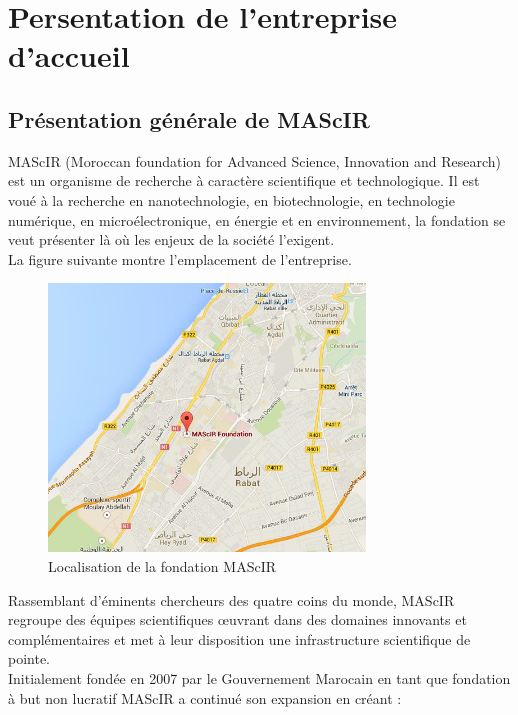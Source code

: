 \documentclass[11pt, a4paper, twoside]{book}
\begin{document}
\pagestyle{plain}

\chapter{Persentation de l'entreprise d'accueil}
\pagestyle{headings}
\section{Présentation générale de MAScIR}
MAScIR (Moroccan foundation for Advanced Science, Innovation and Research) est un organisme de recherche à caractère scientifique et technologique. Il est voué à la recherche en nanotechnologie, en biotechnologie, en technologie numérique, en microélectronique, en énergie et en environnement, la fondation se veut présenter là où les enjeux de la société l’exigent.\\

La figure suivante montre l’emplacement de l’entreprise.

\begin{figure}[h]
\centering
\includegraphics[width=0.75\textwidth]{mascir_map}
\caption{Localisation de la fondation MAScIR}
\end{figure}

Rassemblant d’éminents chercheurs des quatre coins du monde, MAScIR regroupe des équipes scientifiques œuvrant dans des domaines innovants et complémentaires et met à leur disposition une infrastructure scientifique de pointe.\\

Initialement fondée en 2007 par le Gouvernement Marocain en tant que fondation à but non lucratif MAScIR a continué son expansion en créant :
\end{document}
